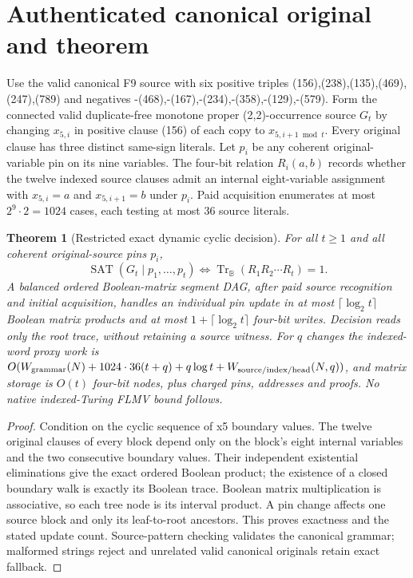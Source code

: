 \documentclass[11pt]{article}
\newtheorem{theorem}{Theorem}
\begin{document}
\section{Authenticated canonical original and theorem}
Use the valid canonical F9 source with six positive triples (156),(238),(135),(469),(247),(789) and negatives -(468),-(167),-(234),-(358),-(129),-(579). Form the connected valid duplicate-free monotone proper (2,2)-occurrence source $G_t$ by changing $x_{5,i}$ in positive clause (156) of each copy to $x_{5,i+1\bmod t}$. Every original clause has three distinct same-sign literals. Let $p_i$ be any coherent original-variable pin on its nine variables. The four-bit relation $R_i(a,b)$ records whether the twelve indexed source clauses admit an internal eight-variable assignment with $x_{5,i}=a$ and $x_{5,i+1}=b$ under $p_i$. Paid acquisition enumerates at most $2^9\cdot2=1024$ cases, each testing at most 36 source literals.
\begin{theorem}[Restricted exact dynamic cyclic decision]
For all $t\ge1$ and all coherent original-source pins $p_i$,
\[
\operatorname{SAT}(G_t\mid p_1,\ldots,p_t)
\iff \operatorname{Tr}_{\mathbb B}(R_1R_2\cdots R_t)=1.
\]
A balanced ordered Boolean-matrix segment DAG, after paid source recognition and initial acquisition, handles an individual pin update in at most $\lceil\log_2t\rceil$ Boolean matrix products and at most $1+\lceil\log_2t\rceil$ four-bit writes. Decision reads only the root trace, without retaining a source witness. For $q$ changes the indexed-word proxy work is $O(W_{\rm grammar}(N)+1024\cdot36(t+q)+q\log t+W_{\rm source/index/head}(N,q))$, and matrix storage is $O(t)$ four-bit nodes, plus charged pins, addresses and proofs. No native indexed-Turing FLMV bound follows.
\end{theorem}
\begin{proof}
Condition on the cyclic sequence of x5 boundary values. The twelve original clauses of every block depend only on the block's eight internal variables and the two consecutive boundary values. Their independent existential eliminations give the exact ordered Boolean product; the existence of a closed boundary walk is exactly its Boolean trace. Boolean matrix multiplication is associative, so each tree node is its interval product. A pin change affects one source block and only its leaf-to-root ancestors. This proves exactness and the stated update count. Source-pattern checking validates the canonical grammar; malformed strings reject and unrelated valid canonical originals retain exact fallback.
\end{proof}
\end{document}
